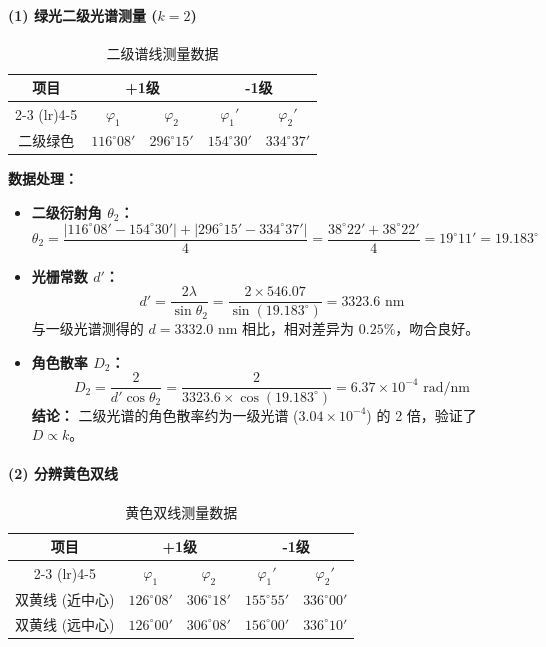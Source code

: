 \documentclass[]{../../templates/Report}%
\begin{document}
\begin{fullreportonly}
\paragraph{(1) 绿光二级光谱测量 ($k=2$)} \mbox{}
\begin{table}[H]
    \centering
    \caption{二级谱线测量数据}
    \begin{tabular}{ccccc}
        \toprule
        \multirow{2}{*}{项目} & \multicolumn{2}{c}{+1级} & \multicolumn{2}{c}{-1级} \\
        \cmidrule(lr){2-3} \cmidrule(lr){4-5}
         & $\varphi_1$ & $\varphi_2$ & $\varphi_1'$ & $\varphi_2'$ \\
        \midrule
        二级绿色 & $116^\circ 08'$ & $296^\circ 15'$ & $154^\circ 30'$ & $334^\circ 37'$ \\
        \bottomrule
    \end{tabular}
\end{table}

\textbf{数据处理：}
\begin{itemize}
    \item \textbf{二级衍射角 $\theta_2$：}
    \[
    \theta_2 = \frac{|116^\circ 08' - 154^\circ 30'| + |296^\circ 15' - 334^\circ 37'|}{4} = \frac{38^\circ 22' + 38^\circ 22'}{4} = 19^\circ 11' = 19.183^\circ
    \]
    \item \textbf{光栅常数 $d'$：}
    \[
    d' = \frac{2\lambda}{\sin \theta_2} = \frac{2 \times 546.07}{\sin(19.183^\circ)} = 3323.6 \text{ nm}
    \]
    与一级光谱测得的 $d=3332.0 \text{ nm}$ 相比，相对差异为 $0.25\%$，吻合良好。
    \item \textbf{角色散率 $D_2$：}
    \[
    D_2 = \frac{2}{d' \cos \theta_2} = \frac{2}{3323.6 \times \cos(19.183^\circ)} = 6.37 \times 10^{-4} \text{ rad/nm}
    \]
    \textbf{结论：} 二级光谱的角色散率约为一级光谱 ($3.04 \times 10^{-4}$) 的 2 倍，验证了 $D \propto k$。
\end{itemize}

\paragraph{(2) 分辨黄色双线} \mbox{}
\begin{table}[H]
    \centering
    \caption{黄色双线测量数据}
    \begin{tabular}{ccccc}
        \toprule
        \multirow{2}{*}{项目} & \multicolumn{2}{c}{+1级} & \multicolumn{2}{c}{-1级} \\
        \cmidrule(lr){2-3} \cmidrule(lr){4-5}
         & $\varphi_1$ & $\varphi_2$ & $\varphi_1'$ & $\varphi_2'$ \\
        \midrule
        双黄线 (近中心) & $126^\circ 08'$ & $306^\circ 18'$ & $155^\circ 55'$ & $336^\circ 00'$ \\
        双黄线 (远中心) & $126^\circ 00'$ & $306^\circ 08'$ & $156^\circ 00'$ & $336^\circ 10'$ \\
        \bottomrule
    \end{tabular}
\end{table}


\end{fullreportonly}
\end{document}
